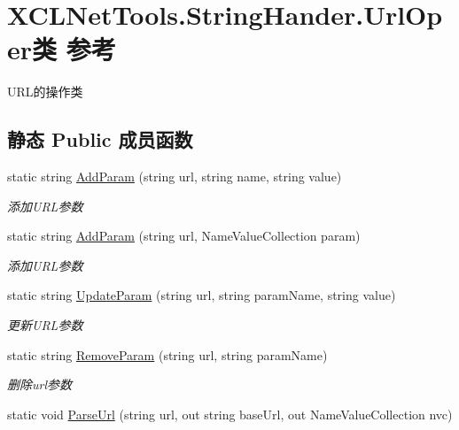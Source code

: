 \hypertarget{class_x_c_l_net_tools_1_1_string_hander_1_1_url_oper}{\section{X\-C\-L\-Net\-Tools.\-String\-Hander.\-Url\-Oper类 参考}
\label{class_x_c_l_net_tools_1_1_string_hander_1_1_url_oper}
}


U\-R\-L的操作类  


\subsection*{静态 Public 成员函数}
\begin{DoxyCompactItemize}
\item 
static string \hyperlink{class_x_c_l_net_tools_1_1_string_hander_1_1_url_oper_a63e4554d226a4e22cdf68614d6fdd1c1}{Add\-Param} (string url, string name, string value)
\begin{DoxyCompactList}\small\item\em 添加\-U\-R\-L参数 \end{DoxyCompactList}\item 
static string \hyperlink{class_x_c_l_net_tools_1_1_string_hander_1_1_url_oper_ae4e0043d5ebfc5401f90242992071fdc}{Add\-Param} (string url, Name\-Value\-Collection param)
\begin{DoxyCompactList}\small\item\em 添加\-U\-R\-L参数 \end{DoxyCompactList}\item 
static string \hyperlink{class_x_c_l_net_tools_1_1_string_hander_1_1_url_oper_adda296014d4edff564f69975de4d3171}{Update\-Param} (string url, string param\-Name, string value)
\begin{DoxyCompactList}\small\item\em 更新\-U\-R\-L参数 \end{DoxyCompactList}\item 
static string \hyperlink{class_x_c_l_net_tools_1_1_string_hander_1_1_url_oper_aee0fcf87276a12d12e71d2d905e286e0}{Remove\-Param} (string url, string param\-Name)
\begin{DoxyCompactList}\small\item\em 删除url参数 \end{DoxyCompactList}\item 
static void \hyperlink{class_x_c_l_net_tools_1_1_string_hander_1_1_url_oper_a8786e6cf26b3496627bbcc037ca72ca7}{Parse\-Url} (string url, out string base\-Url, out Name\-Value\-Collection nvc)

\end{DoxyCompactItemize}
